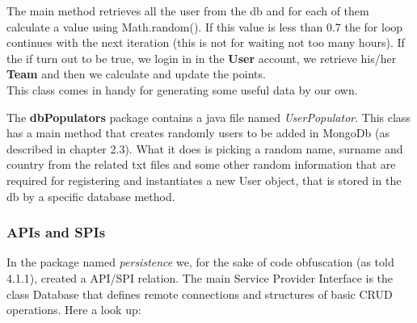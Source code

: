 The main method retrieves all the user from the db and for each of them calculate a value using Math.random(). If this value is less than 0.7 the for loop continues with the next iteration (this is not for waiting not too many hours). If the if turn out to be true, we login in in the \textbf{User} account, we retrieve his/her \textbf{Team} and then we calculate and update the points.\\
This class comes in handy for generating some useful data by our own.

The \textbf{dbPopulators} package contains a java file named \textit{UserPopulator}. This class has a main method that creates randomly users to be added in MongoDb (as described in chapter 2.3). What it does is picking a random name, surname and country from the related txt files and some other random information that are required for registering and instantiates a new User object, that is stored in the db by a specific database method.

\subsubsection{APIs and SPIs}
In the package named \textit{persistence} we, for the sake of code obfuscation (as told 4.1.1), created a API/SPI relation. The main Service Provider Interface is the class Database that defines remote connections and structures of basic CRUD operations. Here a look up:

